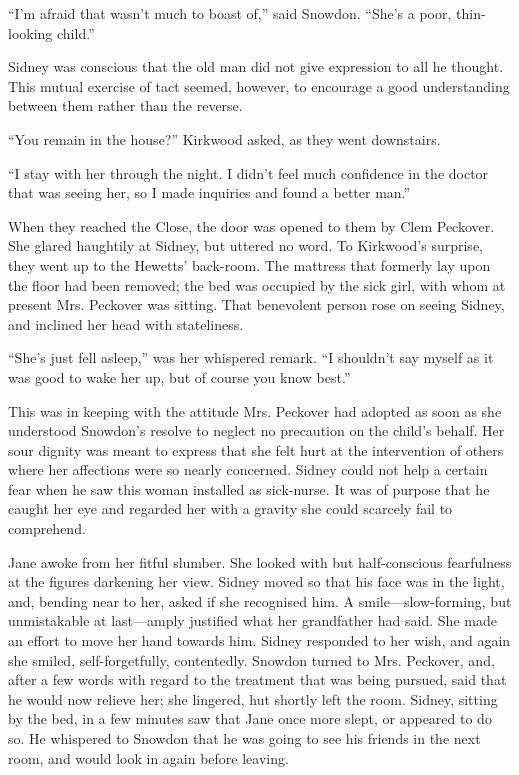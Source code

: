 ``I'm afraid that wasn't much to boast of,'' said Snowdon. ``She's a
poor, thin-looking child.''

Sidney was conscious that the old man did not give expression to all he
thought. This mutual exercise of tact seemed, however, to
{\protect\hypertarget{148}{}{}}encourage a good understanding between
them rather than the reverse.

``You remain in the house?'' Kirkwood asked, as they went downstairs.

``I stay with her through the night. I didn't feel much confidence in
the doctor that was seeing her, so I made inquiries and found a better
man.''

When they reached the Close, the door was opened to them by Clem
Peckover. She glared haughtily at Sidney, but uttered no word. To
Kirkwood's surprise, they went up to the Hewetts' back-room. The
mattress that formerly lay upon the floor had been removed; the bed was
occupied by the sick girl, with whom at present Mrs. Peckover was
sitting. That benevolent person rose on seeing Sidney, and inclined her
head with stateliness.

``She's just fell asleep,'' was her whispered remark. ``I shouldn't say
myself as it was good to wake her up, but of course you know best.''

This was in keeping with the attitude Mrs.
{\protect\hypertarget{149}{}{}}Peckover had adopted as soon as she
understood Snowdon's resolve to neglect no precaution on the child's
behalf. Her sour dignity was meant to express that she felt hurt at the
intervention of others where her affections were so nearly concerned.
Sidney could not help a certain fear when he saw this woman installed as
sick-nurse. It was of purpose that he caught her eye and regarded her
with a gravity she could scarcely fail to comprehend.

Jane awoke from her fitful slumber. She looked with but half-conscious
fearfulness at the figures darkening her view. Sidney moved so that his
face was in the light, and, bending near to her, asked if she recognised
him. A smile---slow-forming, but unmistakable at last---amply justified
what her grandfather had said. She made an effort to move her hand
towards him. Sidney responded to her wish, and again she smiled,
self-forgetfully, contentedly. Snowdon turned to Mrs. Peckover, and,
after a few words with regard to the
{\protect\hypertarget{150}{}{}}treatment that was being pursued, said
that he would now relieve her; she lingered, hut shortly left the room.
Sidney, sitting by the bed, in a few minutes saw that Jane once more
slept, or appeared to do so. He whispered to Snowdon that he was going
to see his friends in the next room, and would look in again before
leaving.


